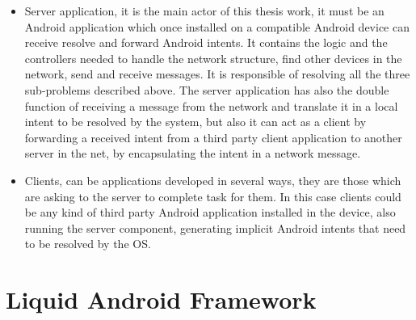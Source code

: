 \begin{itemize}
	\item Server application, it is the main actor of this thesis work, it must be an Android application which once installed on a compatible Android device can receive resolve and forward Android intents. It contains the logic and the controllers needed to handle the network structure, find other devices in the network, send and receive messages. It is responsible of resolving all the three sub-problems described above. The server application has also the double function of receiving a message from the network and translate it in a local intent to be resolved by the system, but also it can act as a client by forwarding a received intent from a third party client application to another server in the net, by encapsulating the intent in a network message.
	\item Clients, can be applications developed in several ways, they are those which are asking to the server to complete task for them. In this case clients could be any kind of third party Android application installed in the device, also running the server component, generating implicit Android intents that need to be resolved by the OS. 

\end{itemize}


\section{Liquid Android Framework}



%
